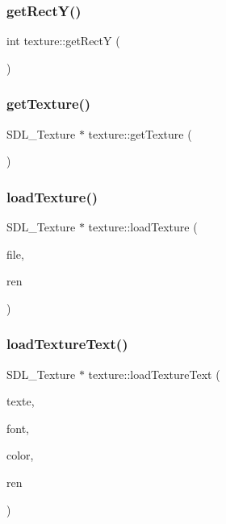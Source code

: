 \subsubsection{\texorpdfstring{get\+Rect\+Y()}{getRectY()}}
{\footnotesize\ttfamily int texture\+::get\+RectY (\begin{DoxyParamCaption}{ }\end{DoxyParamCaption})}

\mbox{\label{classtexture_a60cbac4b525e01409b37f81a1df8eff4}} 
\subsubsection{\texorpdfstring{get\+Texture()}{getTexture()}}
{\footnotesize\ttfamily S\+D\+L\+\_\+\+Texture $\ast$ texture\+::get\+Texture (\begin{DoxyParamCaption}{ }\end{DoxyParamCaption})}

\mbox{\label{classtexture_a49ede423748f70640d15828b7012e8a4}} 
\subsubsection{\texorpdfstring{load\+Texture()}{loadTexture()}}
{\footnotesize\ttfamily S\+D\+L\+\_\+\+Texture $\ast$ texture\+::load\+Texture (\begin{DoxyParamCaption}\item[{const char $\ast$}]{file,  }\item[{S\+D\+L\+\_\+\+Renderer $\ast$}]{ren }\end{DoxyParamCaption})}

\mbox{\label{classtexture_aaae5f9909a7a221b77f3a20a7f4f45ee}} 
\subsubsection{\texorpdfstring{load\+Texture\+Text()}{loadTextureText()}}
{\footnotesize\ttfamily S\+D\+L\+\_\+\+Texture $\ast$ texture\+::load\+Texture\+Text (\begin{DoxyParamCaption}\item[{const char $\ast$}]{texte,  }\item[{T\+T\+F\+\_\+\+Font $\ast$}]{font,  }\item[{S\+D\+L\+\_\+\+Color}]{color,  }\item[{S\+D\+L\+\_\+\+Renderer $\ast$}]{ren }\end{DoxyParamCaption})}

